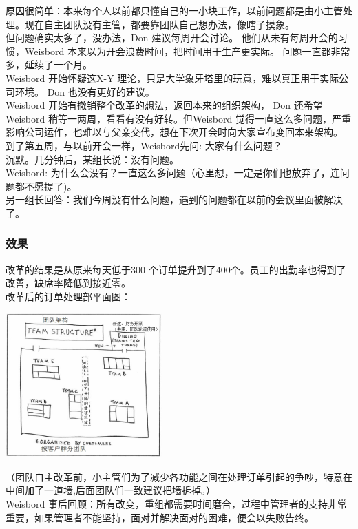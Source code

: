 原因很简单：本来每个人以前都只懂自己的一小块工作，以前问题都是由小主管处理。现在自主团队没有主管，都要靠团队自己想办法，像瞎子摸象。\\
但问题确实太多了，没办法，Don 建议每周开会讨论。
他们从未有每周开会的习惯，Weisbord
本来以为开会浪费时间，把时间用于生产更实际。
问题一直都非常多，延续了一个月。\\
Weisbord 开始怀疑这X-Y
理论，只是大学象牙塔里的玩意，难以真正用于实际公司环境。 Don
也没有更好的建议。\\
Weisbord 开始有撤销整个改革的想法，返回本来的组织架构， Don
还希望Weisbord 稍等一两周，看看有没有好转。但Weisbord
觉得一直这么多问题，严重影响公司运作，也难以与父亲交代，想在下次开会时向大家宣布变回本来架构。\\
到了第五周，与以前开会一样，Weisbord先问: 大家有什么问题？\\
沉默。几分钟后，某组长说：没有问题。\\
Weisbord:
为什么会没有？一直这么多问题（心里想，一定是你们也放弃了，连问题都不愿提了)。\\
另一组长回答：我们今周没有什么问题，遇到的问题都在以前的会议里面被解决了。\\

\hypertarget{ux6548ux679c}{%
\subsubsection{效果}\label{ux6548ux679c}}

改革的结果是从原来每天低于300
个订单提升到了400个。员工的出勤率也得到了改善，缺席率降低到接近零。\\
改革后的订单处理部平面图：


\includegraphics[width=6cm]{0A_Agile_stories_p51.jpg}

（团队自主改革前，小主管们为了减少各功能之间在处理订单引起的争吵，特意在中间加了一道墙,后面团队们一致建议把墙拆掉。）\\
Weisbord 
事后回顾：所有改变，重组都需要时间磨合，过程中管理者的支持非常重要，如果管理者不能坚持，面对并解决面对的困难，便会以失败告终。\\

